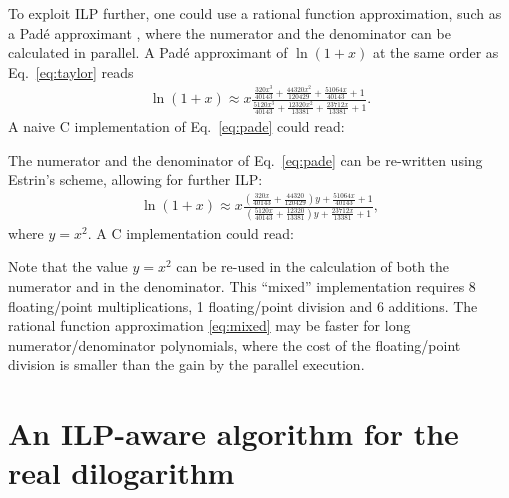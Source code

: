 \documentclass[10pt,DIV16,twocolumn,numbers=noenddot]{scrartcl}
\begin{document}
To exploit ILP further, one could use a rational function
approximation, such as a Padé approximant \cite{pade}, where the
numerator and the denominator can be calculated in parallel.  A Padé
approximant of $\ln(1+x)$ at the same order as Eq.~\eqref{eq:taylor}
reads
%
\begin{align}
  \ln(1+x) \approx x
  \frac{\frac{320 x^3}{40143}+\frac{44320 x^2}{120429}+\frac{51064
    x}{40143}+1}{\frac{5120 x^3}{40143}+\frac{12320 x^2}{13381}+\frac{23712
    x}{13381}+1}.
  \label{eq:pade}
\end{align}
%
A naive C implementation of Eq.~\eqref{eq:pade} could read:
%

%
The numerator and the denominator of Eq.~\eqref{eq:pade} can be
re-written using Estrin's scheme, allowing for further ILP:
%
\begin{align}
  \ln(1+x) \approx x
  \frac{\left(\frac{320 x}{40143}+\frac{44320}{120429}\right)y+\frac{51064
    x}{40143}+1}{\left(\frac{5120 x}{40143}+\frac{12320}{13381}\right)y+\frac{23712
    x}{13381}+1},
  \label{eq:mixed}
\end{align}
%
where $y=x^2$.  A C implementation could read:
%

%
Note that the value $y=x^2$ can be re-used in the calculation of both
the numerator and in the denominator.  This ``mixed'' implementation
requires 8 floating\-/point multiplications, 1 floating\-/point
division and 6 additions.  The rational function approximation
\eqref{eq:mixed} may be faster for long numerator/denominator
polynomials, where the cost of the floating\-/point division is
smaller than the gain by the parallel execution.


\section{An ILP-aware algorithm for the real dilogarithm}
\label{sec:algorithm}
\end{document}
